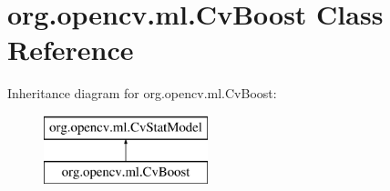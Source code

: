 \hypertarget{classorg_1_1opencv_1_1ml_1_1_cv_boost}{}\section{org.\+opencv.\+ml.\+Cv\+Boost Class Reference}
\label{classorg_1_1opencv_1_1ml_1_1_cv_boost}
Inheritance diagram for org.\+opencv.\+ml.\+Cv\+Boost\+:\begin{figure}[H]
\begin{center}
\leavevmode
\includegraphics[height=2.000000cm]{classorg_1_1opencv_1_1ml_1_1_cv_boost}
\end{center}
\end{figure}
